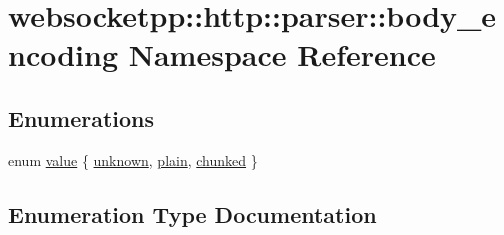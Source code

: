 \hypertarget{namespacewebsocketpp_1_1http_1_1parser_1_1body__encoding}{}\section{websocketpp\+:\+:http\+:\+:parser\+:\+:body\+\_\+encoding Namespace Reference}
\label{namespacewebsocketpp_1_1http_1_1parser_1_1body__encoding}
\subsection*{Enumerations}
\begin{DoxyCompactItemize}
\item 
enum \hyperlink{namespacewebsocketpp_1_1http_1_1parser_1_1body__encoding_a489de0413246f2f6d2d6a6605af16653}{value} \{ \hyperlink{namespacewebsocketpp_1_1http_1_1parser_1_1body__encoding_a489de0413246f2f6d2d6a6605af16653ac8ecc94a1f7b48372ee0e3b1d4f56aee}{unknown}, 
\hyperlink{namespacewebsocketpp_1_1http_1_1parser_1_1body__encoding_a489de0413246f2f6d2d6a6605af16653a4944f60330d88e9721ffff0aa499e243}{plain}, 
\hyperlink{namespacewebsocketpp_1_1http_1_1parser_1_1body__encoding_a489de0413246f2f6d2d6a6605af16653a2a886acf8fdd62685b0e6f9ab43c7381}{chunked}
 \}
\end{DoxyCompactItemize}


\subsection{Enumeration Type Documentation}
\hypertarget{namespacewebsocketpp_1_1http_1_1parser_1_1body__encoding_a489de0413246f2f6d2d6a6605af16653}{}
